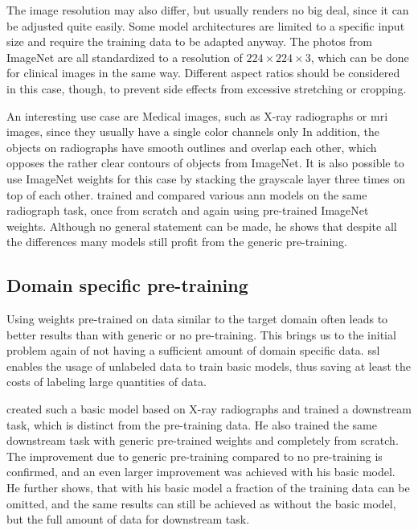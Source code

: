 The image resolution may also differ, but usually renders no big deal, since it can be adjusted quite easily. 
Some model architectures are limited to a specific input size and require the training data to be adapted anyway.
The photos from ImageNet are all standardized to a resolution of $224 \times 224 \times 3$, which can be done for clinical images in the same way.
Different aspect ratios should be considered in this case, though, to prevent side effects from excessive stretching or cropping.

An interesting use case are Medical images, such as X-ray radiographs or \gls{mri} images, since they usually have a single color channels only
In addition, the objects on radiographs have smooth outlines and overlap each other, which opposes the rather clear contours of objects from ImageNet. 
It is also possible to use ImageNet weights for this case by stacking the grayscale layer three times on top of each other.
\autocite{ke2021} trained and compared various \gls{ann} models on the same radiograph task, once from scratch and again using pre-trained ImageNet weights.
Although no general statement can be made, he shows that despite all the differences many models still profit from the generic pre-training.

\subsection{Domain specific pre-training}

Using weights pre-trained on data similar to the target domain often leads to better results than with generic or no pre-training.
This brings us to the initial problem again of not having a sufficient amount of domain specific data.
\gls{ssl} enables the usage of unlabeled data to train basic models, thus saving at least the costs of labeling large quantities of data.

\autocite{cho2023} created such a basic model based on X-ray radiographs and trained a downstream task, which is distinct from the pre-training data.
He also trained the same downstream task with generic pre-trained weights and completely from scratch.
The improvement due to generic pre-training compared to no pre-training is confirmed, and an even larger improvement was achieved with his basic model.
He further shows, that with his basic model a fraction of the training data can be omitted, and the same results can still be achieved as without the basic model, but the full amount of data for downstream task. 


